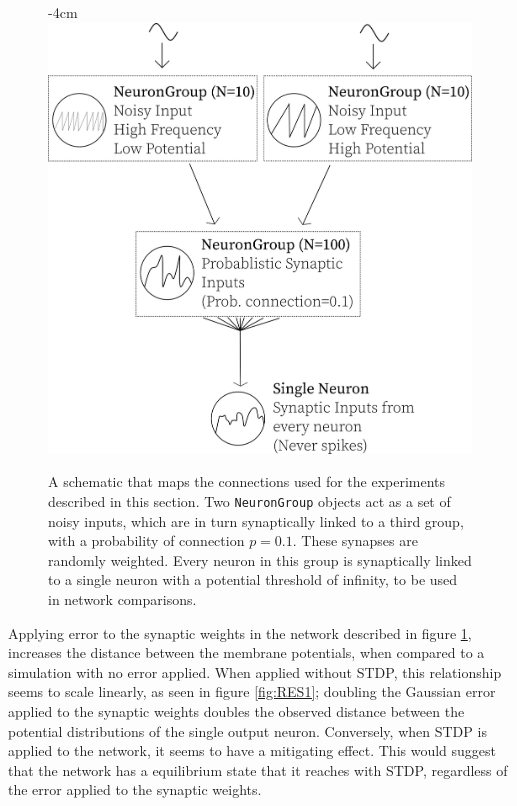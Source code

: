 \begin{figure}[h!]
    \centering
    \addtolength{\leftskip} {-4cm}
    \addtolength{\rightskip}{-4cm}
    \includegraphics[width=0.5\linewidth]{figures/tops/ExperimentLayout.png}
    \caption[Example Network Setup]{A schematic that maps the connections used for the experiments described in this section. Two \texttt{NeuronGroup} objects act as a set of noisy inputs, which are in turn synaptically linked to a third group, with a probability of connection $p=0.1$. These synapses are randomly weighted. Every neuron in this group is synaptically linked to a single neuron with a potential threshold of infinity, to be used in network comparisons.}
    \label{fig:RES1TOP}
\end{figure}
\FloatBarrier

Applying error to the synaptic weights in the network described in figure
\ref{fig:RES1TOP}, increases the distance between the membrane potentials, when
compared to a simulation with no error applied. When applied without STDP, this
relationship seems to scale linearly, as seen in figure \ref{fig:RES1}; doubling
the Gaussian error applied to the synaptic weights doubles the observed distance
between the potential distributions of the single output neuron. Conversely,
when STDP is applied to the network, it seems to have a mitigating effect. This
would suggest that the network has a equilibrium state that it reaches with
STDP, regardless of the error applied to the synaptic weights.

